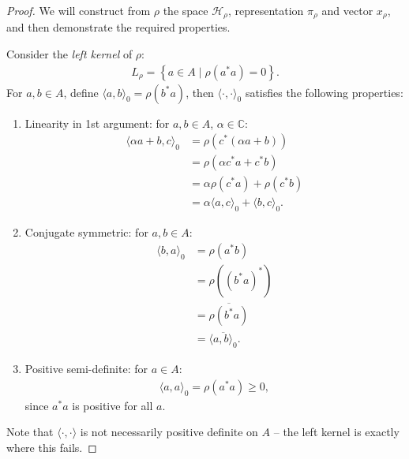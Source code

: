 \documentclass[11pt,a4paper]{report}
\theoremstyle{plain}
\theoremstyle{definition}
\newcommand{\1}{\mathbbm{1}}
\newcommand{\Hr}{\mathcal{H}_\rho}
\begin{document}
\begin{proof}
	We will construct from $\rho$ the space $\Hr$, representation $\pi_\rho$ and 
	vector $x_\rho$, and then demonstrate the required properties.
	
	Consider the \emph{left kernel} of $\rho$:
	\begin{align*}
		L_\rho = \left\{a \in A \mid \rho (a ^\ast a) = 0 \right\}.
	\end{align*}	
	For $a,b \in A$, define $\langle a , b \rangle_0 = \rho(b^\ast a)$, then 
	$\langle \cdot, \cdot \rangle_0$ satisfies the following properties:
	\begin{enumerate}
	  \item Linearity in 1st argument: for $a,b\in A$, $\alpha \in \mathbb{C}$:
		\begin{align*}
		   \langle \alpha a +  b, c \rangle_0 
		&= \rho (c^\ast(\alpha a +  b)   		)										\\
		&= \rho (\alpha c^\ast a +  c^\ast b)  											\\
		&= \alpha \rho (c^\ast a) +  \rho (c^\ast b)									\\
		&= \alpha \langle a , c \rangle_0 +  \langle b, c \rangle_0.
		\end{align*}
	  \item Conjugate symmetric: for $a,b \in A$:
	  	\begin{align*}
	  	   \langle b,a \rangle _0 
	  	&= \rho (a^\ast b)																\\
	  	&= \rho ((b^\ast a)^\ast)														\\
	  	&= \overline{\rho (b^\ast a)}													\\
	  	&= \overline{\langle a,b \rangle _0 }.
	  	\end{align*}
	  \item Positive semi-definite: for $a \in A$:
	  	\begin{align*}
	  		\langle a,a\rangle_0 = \rho(a^\ast a) \geq 0,
	  	\end{align*}
	  	since $a^\ast a$ is positive for all $a$.
	\end{enumerate}
	Note that $\langle \cdot, \cdot \rangle$ is not necessarily positive definite on 
	$A$ -- the left kernel is exactly where this fails.
	

\end{proof}
\end{document}
